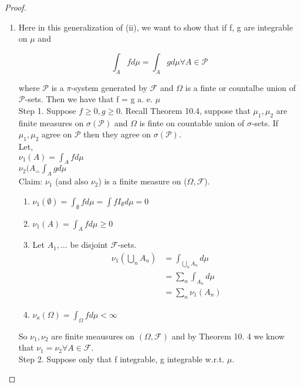 \documentclass[11pt,fleqn]{book} %
\begin{document}
\begin{proof}
\begin{enumerate}
\item Here in this generalization of (ii), we want to show that if f, g are integrable on $\mu$ and 

		$$\int_A f d\mu = \int_A g d\mu \forall A \in \mathcal{P} $$

where $\mathcal{P}$ is a $\pi$-system generated by $\mathcal{F}$ and $\Omega$ is a finte or countalbe union of $\mathcal{P}$-sets. Then we have that f = g a. e. $\mu$\\


		Step 1. Suppose $f \geq 0, g \geq 0$. Recall Theorem 10.4, suppose that $\mu_1, \mu_2$ are finite measures on $\sigma(\mathcal{P})$ and $\Omega$ is finte on countable union of $\sigma$-sets. If $\mu_1, \mu_2$ agree on $\mathcal{P}$ then they agree on $\sigma(\mathcal{P})$. \\


		Let, \\

		$\nu_1(A) = \int_A f d\mu$\\
		$\nu_2(A_ = \int_A g d\mu$\\


		Claim: $\nu_1$ (and also $\nu_2$) is a finite measure on ($\Omega, \mathcal{F}$). \\

				\begin{enumerate}
					\item $\nu_1(\emptyset) = \int_\emptyset f d\mu = \int f I_\emptyset d\mu = 0$
					\item $\nu_1(A) = \int_A f d\mu \geq 0$
					\item Let $A_1, \dots$ be disjoint $\mathcal{F}$-sets. \\

							\begin{align*}
								\nu_1(\bigcup_n A_n) &= \int_{\bigcup_n A_n} d\mu \\
										&= \sum_n \int_{A_n} d\mu\\
										&= \sum_n \nu_1(A_n)
							\end{align*}
					\item $\nu_a(\Omega) = \int_\Omega f d\mu < \infty$
				\end{enumerate}

		So $\nu_1, \nu_2$ are finite meausures on $(\Omega, \mathcal{F})$ and by Theorem 10. 4 we know that $\nu_1 = \nu_2 \forall A \in \mathcal{F}$.\\

		Step 2. Suppose only that f integrable, g integrable w.r.t. $\mu$. 


\end{enumerate}
\end{proof}
\end{document}
